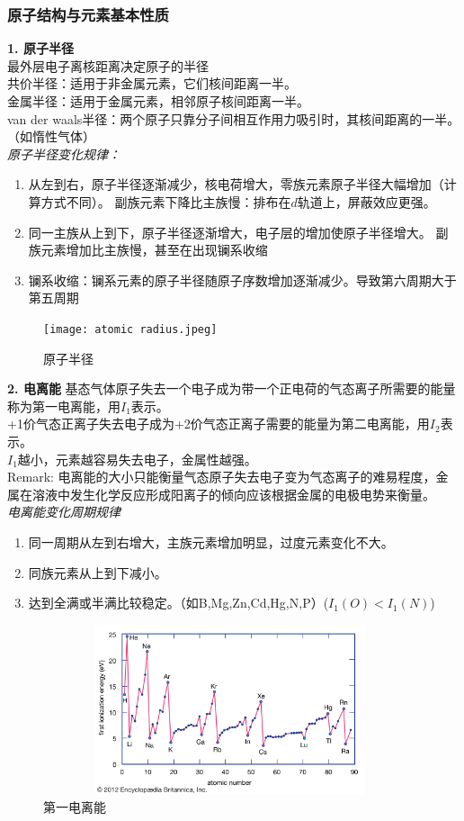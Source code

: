 \documentclass[utf8,a4paper,12pt]{ctexart}
\begin{document}
\subsubsection{原子结构与元素基本性质}
{\bf 1. 原子半径}\\
最外层电子离核距离决定原子的半径\\
共价半径：适用于非金属元素，它们核间距离一半。\\
金属半径：适用于金属元素，相邻原子核间距离一半。\\
van der waals半径：两个原子只靠分子间相互作用力吸引时，其核间距离的一半。（如惰性气体）\\
\emph{原子半径变化规律：}
\begin{enumerate}[1)]
\item 从左到右，原子半径逐渐减少，核电荷增大，零族元素原子半径大幅增加（计算方式不同）。
副族元素下降比主族慢：排布在$d$轨道上，屏蔽效应更强。
\item 同一主族从上到下，原子半径逐渐增大，电子层的增加使原子半径增大。
副族元素增加比主族慢，甚至在出现镧系收缩
\item 镧系收缩：镧系元素的原子半径随原子序数增加逐渐减少。导致第六周期大于第五周期
\end{enumerate}
\begin{figure}[H]
\centering
\texttt{[image: atomic radius.jpeg]}
\caption{原子半径}
\end{figure}
{\bf 2. 电离能}
基态气体原子失去一个电子成为带一个正电荷的气态离子所需要的能量称为第一电离能，用$I_1$表示。\\
+1价气态正离子失去电子成为+2价气态正离子需要的能量为第二电离能，用$I_2$表示。\\
$I_1$越小，元素越容易失去电子，金属性越强。\\
Remark: 电离能的大小只能衡量气态原子失去电子变为气态离子的难易程度，金属在溶液中发生化学反应形成阳离子的倾向应该根据金属的电极电势来衡量。\\
\emph{电离能变化周期规律}
\begin{enumerate}[1)]
\item 同一周期从左到右增大，主族元素增加明显，过度元素变化不大。
\item 同族元素从上到下减小。
\item 达到全满或半满比较稳定。（如B,Mg,Zn,Cd,Hg,N,P）($I_1(O)<I_1(N)$)
\end{enumerate}
\begin{figure}[H]
\centering
\includegraphics[width=11cm,height=5cm]{ionization-energy-element-atom-electron-energies-nonmetal}
\caption{第一电离能}
\end{figure}
\end{document}
